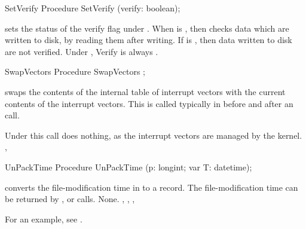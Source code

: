 \begin{procedure}{SetVerify}
\Declaration
Procedure SetVerify (verify: boolean);

\Description

 sets the status of the verify flag under \dos. When
 is , then \dos checks data which are written to disk,
by reading them after writing. If  is , then data
written to disk are not verified.
\Errors
Under \linux,  Verify is always
.
\SeeAlso
{}
\end{procedure}
\begin{procedure}{SwapVectors}
\Declaration
Procedure SwapVectors ;

\Description

 swaps the contents of the internal table of interrupt 
vectors with the current contents of the interrupt vectors.
This is called typically in before and after an  call.

\Errors
Under \linux this call does nothing, as the interrupt vectors are 
managed by the kernel.
\SeeAlso
{}, 
\end{procedure}
\begin{procedure}{UnPackTime}
\Declaration
Procedure UnPackTime (p: longint; var T: datetime);

\Description

 converts the file-modification time in 
to a  record. The file-modification time can be 
returned by ,  or  calls.
\Errors
None.
\SeeAlso
{}, , , 
\end{procedure}
For an example, see .

